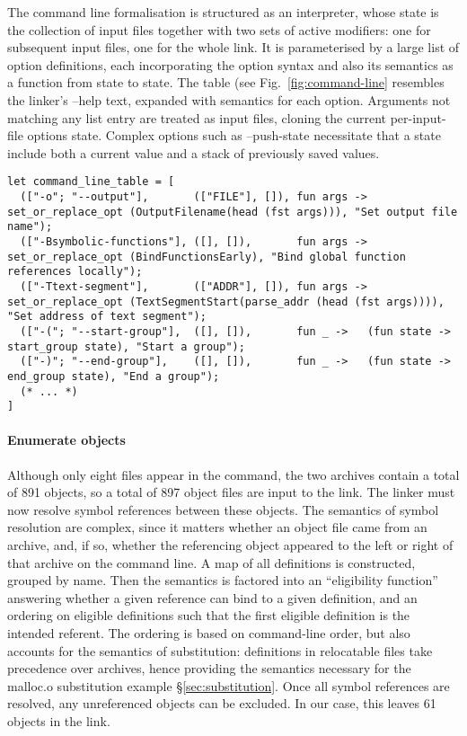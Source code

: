 The command line formalisation is structured as an interpreter, whose state 
is the collection of input files together with two sets of active modifiers: one for subsequent 
input files, one for the whole link.
It is parameterised by a large list of option definitions, 
each incorporating the option syntax and also its semantics as a function from state to state.
The table (see Fig.~\ref{fig:command-line} resembles the linker's \textsf{--help} text, expanded
with semantics for each option.
Arguments not matching any list entry are treated as input files, cloning the current per-input-file options state.
Complex options such as \textsf{--push-state} necessitate that a state include both a current value and a stack of previously saved values.

\begin{figure*}
\begin{lstlisting}[language=plain,basicstyle=\scriptsize\sffamily]
let command_line_table = [
  (["-o"; "--output"],       (["FILE"], []), fun args -> set_or_replace_opt (OutputFilename(head (fst args))), "Set output file name");
  (["-Bsymbolic-functions"], ([], []),       fun args -> set_or_replace_opt (BindFunctionsEarly), "Bind global function references locally");
  (["-Ttext-segment"],       (["ADDR"], []), fun args -> set_or_replace_opt (TextSegmentStart(parse_addr (head (fst args)))), "Set address of text segment");
  (["-("; "--start-group"],  ([], []),       fun _ ->   (fun state -> start_group state), "Start a group");
  (["-)"; "--end-group"],    ([], []),       fun _ ->   (fun state -> end_group state), "End a group");
  (* ... *)
]
\end{lstlisting}
\caption{Excerpt from the specification of GNU linker command-line options}
\label{fig:command-line}
\end{figure*}

\paragraph{Enumerate objects} 
Although only eight files appear in the command, the two archives contain a total of 891 objects, so 
a total of 897 object files are input to the link.
The linker must now resolve symbol references between these objects.
The semantics of symbol resolution are complex, since 
it matters whether an object file came from an archive, and, if so, 
whether the referencing object appeared to the left or right of that archive on the command line.
A map of all definitions is constructed, grouped by name.
Then the semantics is factored into an ``eligibility function'' answering whether a given
reference can bind to a given definition, and an 
ordering on eligible definitions such that
the first eligible definition is the intended referent.
The ordering is based on command-line order, but also accounts for the semantics of 
substitution: definitions in relocatable files take precedence over archives, hence 
providing the semantics necessary for the \textsf{malloc.o} substitution example \S\ref{sec:substitution}.
Once all symbol references are resolved, any unreferenced objects can be excluded.
In our case, this leaves 61 objects in the link.

